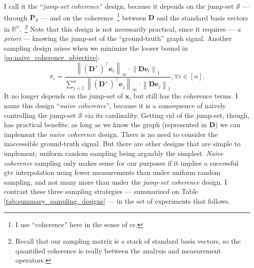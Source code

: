 I call it the ``\emph{jump-set coherence}'' design, because it depends on the jump-set $\mathcal{S}$ --- through $\mathbf{P}_{\mathcal{S}}$ --- and on the coherence~\footnote{I use ``coherence'' here in the sense of \acrlong{cs}.} between $\mathbf{D}$ and the standard basis vectors in $\mathbb{R}^{n}$.~\footnote{Recall that our sampling matrix is a stack of standard basis vectors, so the quantified coherence is really between the analysis and measurement operators.} Note that this design is not necessarily practical, since it requires --- \emph{a priori} --- knowing the jump-set of the ``ground-truth'' graph signal. Another sampling design arises when we minimize the looser bound in \eqref{eq:naive_coherence_objective}:
\begin{equation}
    \pi_i = \frac{\left \| (\mathbf{D}^{+})^{\top} \mathbf{e}_{i} \right \|_{\infty} \cdot \left \| \mathbf{D} \mathbf{e}_{i} \right \|_{1}}{\sum_{j=1}^{n} \left \| (\mathbf{D}^{+})^{\top} \mathbf{e}_{j} \right \|_{\infty} \cdot \left \| \mathbf{D} \mathbf{e}_{j} \right \|_{1}}, \forall i \in [n].
    \label{eq:naive_coherence_probabilities}
\end{equation}
It no longer depends on the jump-set of $\mathbf{x}$, but still has the coherence terms. I name this design ``\emph{naive coherence}'', because it is a consequence of naively controlling the jump-set $\mathcal{S}$ via its cardinality. Getting rid of the jump-set, though, has practical benefits: as long as we know the graph (represented in $\mathbf{D}$) we can implement the \emph{naive coherence} design. There is no need to consider the inaccessible ground-truth signal. But there are other designs that are simple to implement; uniform random sampling being arguably the simplest. \emph{Naive coherence} sampling only makes sense for our purposes if it implies a successful \acrshort{gtv} interpolation using fewer measurements than under uniform random sampling, and not many more than under the \emph{jump-set coherence} design. I contrast these three sampling strategies --- summarized on Table \ref{tab:summary_sampling_designs} --- in the set of experiments that follows.

